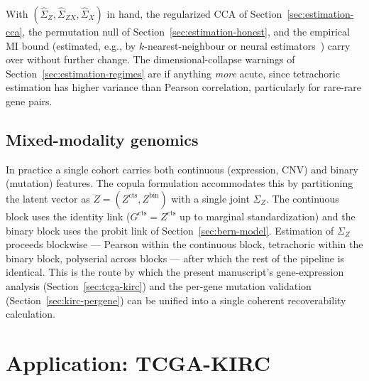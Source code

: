 \documentclass{article}
\begin{document}
With $(\hat\Sigma_Z, \hat\Sigma_{ZX}, \hat\Sigma_X)$ in hand, the regularized
CCA of Section~\ref{sec:estimation-cca}, the permutation null of
Section~\ref{sec:estimation-honest}, and the empirical MI bound
(estimated, e.g., by $k$-nearest-neighbour or neural
estimators~\citep{kraskov2004mi,belghazi2018mine,paninski2003entropy}) carry over
without further change. The dimensional-collapse warnings of
Section~\ref{sec:estimation-regimes} are if anything \emph{more} acute, since
tetrachoric estimation has higher variance than Pearson correlation,
particularly for rare-rare gene pairs.

\subsection{Mixed-modality genomics}
\label{sec:bern-mixed}

In practice a single cohort carries both continuous (expression, CNV) and
binary (mutation) features. The copula formulation accommodates this by
partitioning the latent vector as $Z = (Z^{\mathrm{cts}}, Z^{\mathrm{bin}})$
with a single joint $\Sigma_Z$. The continuous block uses the identity link
($G^{\mathrm{cts}} = Z^{\mathrm{cts}}$ up to marginal standardization) and the
binary block uses the probit link of Section~\ref{sec:bern-model}. Estimation
of $\Sigma_Z$ proceeds blockwise --- Pearson within the continuous block,
tetrachoric within the binary block, polyserial across blocks --- after which
the rest of the pipeline is identical. This is the route by which the present
manuscript's gene-expression analysis (Section~\ref{sec:tcga-kirc}) and the
per-gene mutation validation (Section~\ref{sec:kirc-pergene}) can be unified
into a single coherent recoverability calculation.

\section{Application: TCGA-KIRC}
\label{sec:kirc}
\label{sec:tcga-kirc}
\end{document}
